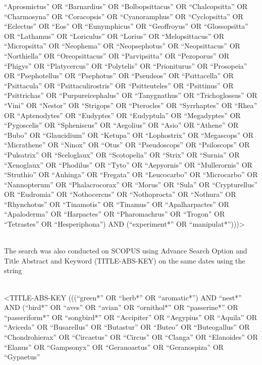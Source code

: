 \documentclass[
  number,
  review,
  onecolumn]{elsarticle}
\begin{document}
``Aprosmictus'' OR ``Barnardius'' OR ``Bolbopsittacus'' OR
``Chalcopsitta'' OR ``Charmosyna'' OR ``Coracopsis'' OR ``Cyanoramphus''
OR ``Cyclopsitta'' OR ``Eclectus'' OR ``Eos'' OR ``Eunymphicus'' OR
``Geoffroyus'' OR ``Glossopsitta'' OR ``Lathamus'' OR ``Loriculus'' OR
``Lorius'' OR ``Melopsittacus'' OR ``Micropsitta'' OR ``Neophema'' OR
``Neopsephotus'' OR ``Neopsittacus'' OR ``Northiella'' OR
``Oreopsittacus'' OR ``Parvipsitta'' OR ``Pezoporus'' OR ``Phigys'' OR
``Platycercus'' OR ``Polytelis'' OR ``Prioniturus'' OR ``Prosopeia'' OR
``Psephotellus'' OR ``Psephotus'' OR ``Pseudeos'' OR ``Psittacella'' OR
``Psittacula'' OR ``Psittaculirostris'' OR ``Psitteuteles'' OR
``Psittinus'' OR ``Psittrichas'' OR ``Purpureicephalus'' OR
``Tanygnathus'' OR ``Trichoglossus'' OR ``Vini'' OR ``Nestor'' OR
``Strigops'' OR ``Pterocles'' OR ``Syrrhaptes'' OR ``Rhea'' OR
``Aptenodytes'' OR ``Eudyptes'' OR ``Eudyptula'' OR ``Megadyptes'' OR
``Pygoscelis'' OR ``Spheniscus'' OR ``Aegolius'' OR ``Asio'' OR
``Athene'' OR ``Bubo'' OR ``Glaucidium'' OR ``Ketupa'' OR ``Lophostrix''
OR ``Megascops'' OR ``Micrathene'' OR ``Ninox'' OR ``Otus'' OR
``Pseudoscops'' OR ``Psiloscops'' OR ``Pulsatrix'' OR ``Sceloglaux'' OR
``Scotopelia'' OR ``Strix'' OR ``Surnia'' OR ``Xenoglaux'' OR
``Phodilus'' OR ``Tyto'' OR ``Aepyornis'' OR ``Mullerornis'' OR
``Struthio'' OR ``Anhinga'' OR ``Fregata'' OR ``Leucocarbo'' OR
``Microcarbo'' OR ``Nannopterum'' OR ``Phalacrocorax'' OR ``Morus'' OR
``Sula'' OR ``Crypturellus'' OR ``Eudromia'' OR ``Nothocercus'' OR
``Nothoprocta'' OR ``Nothura'' OR ``Rhynchotus'' OR ``Tinamotis'' OR
``Tinamus'' OR ``Apalharpactes'' OR ``Apaloderma'' OR ``Harpactes'' OR
``Pharomachrus'' OR ``Trogon'' OR ``Tetrastes'' OR ``Hesperiphona'') AND
(``experiment*'' OR ``manipulat*'')))\textgreater{}\\
\strut \\
The search was also conducted on SCOPUS using Advance Search Option and
Title Abstract and Keyword (TITLE-ABS-KEY) on the same dates using the
string\\
\strut \\
\textless TITLE-ABS-KEY (((``green*'' OR ``herb*'' OR ``aromatic*'') AND
``nest*'' AND (``bird*'' OR ``aves'' OR ``avian'' OR ``ornithol*'' OR
``passerine*'' OR ``passeriform*'' OR ``songbird*'' OR ``Accipiter'' OR
``Aegypius'' OR ``Aquila'' OR ``Aviceda'' OR ``Busarellus'' OR
``Butastur'' OR ``Buteo'' OR ``Buteogallus'' OR ``Chondrohierax'' OR
``Circaetus'' OR ``Circus'' OR ``Clanga'' OR ``Elanoides'' OR ``Elanus''
OR ``Gampsonyx'' OR ``Geranoaetus'' OR ``Geranospiza'' OR ``Gypaetus''
\end{document}
